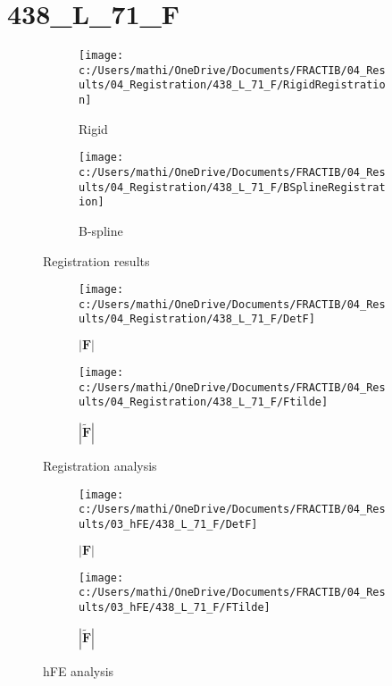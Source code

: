 \documentclass{article}%
\begin{document}
%
\newpage%
\section*{438\_L\_71\_F}%
\label{sec:438L71F}%


\begin{figure}[h!]%
\begin{subfigure}[b]{0.5\linewidth}%
\texttt{[image: c:/Users/mathi/OneDrive/Documents/FRACTIB/04\_Results/04\_Registration/438\_L\_71\_F/RigidRegistration]}%
\caption{Rigid}%
\end{subfigure}%
\begin{subfigure}[b]{0.5\linewidth}%
\texttt{[image: c:/Users/mathi/OneDrive/Documents/FRACTIB/04\_Results/04\_Registration/438\_L\_71\_F/BSplineRegistration]}%
\caption{B{-}spline}%
\end{subfigure}%
\caption{Registration results}%
\end{figure}

%


\begin{figure}[h!]%
\begin{subfigure}[b]{0.5\linewidth}%
\texttt{[image: c:/Users/mathi/OneDrive/Documents/FRACTIB/04\_Results/04\_Registration/438\_L\_71\_F/DetF]}%
\caption{$|\mathbf{F}|$}%
\end{subfigure}%
\begin{subfigure}[b]{0.5\linewidth}%
\texttt{[image: c:/Users/mathi/OneDrive/Documents/FRACTIB/04\_Results/04\_Registration/438\_L\_71\_F/Ftilde]}%
\caption{$|\widetilde{\mathbf{F}}|$}%
\end{subfigure}%
\caption{Registration analysis}%
\end{figure}

%


\begin{figure}[h!]%
\begin{subfigure}[b]{0.5\linewidth}%
\texttt{[image: c:/Users/mathi/OneDrive/Documents/FRACTIB/04\_Results/03\_hFE/438\_L\_71\_F/DetF]}%
\caption{$|\mathbf{F}|$}%
\end{subfigure}%
\begin{subfigure}[b]{0.5\linewidth}%
\texttt{[image: c:/Users/mathi/OneDrive/Documents/FRACTIB/04\_Results/03\_hFE/438\_L\_71\_F/FTilde]}%
\caption{$|\widetilde{\mathbf{F}}|$}%
\end{subfigure}%
\caption{hFE analysis}%
\end{figure}
\end{document}
